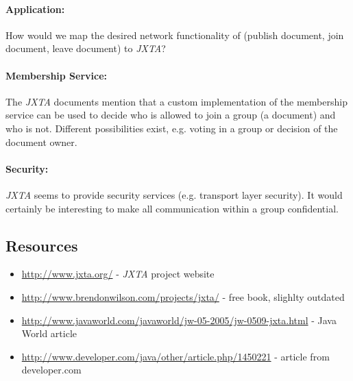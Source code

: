 \paragraph{Application:} How would we map the desired network functionality of \ace (publish document, join document, leave document) to \emph{JXTA}?

\paragraph{Membership Service:} The \emph{JXTA} documents mention that a custom implementation of the membership service can be used to decide who is allowed to join a group (a document) and who is not. Different possibilities exist, e.g. voting in a group or decision of the document owner.

\paragraph{Security:} \emph{JXTA} seems to provide security services (e.g. transport layer security). It would certainly be interesting to make all communication within a group confidential.



\subsection{Resources}
\begin{itemize}
 \item \url{http://www.jxta.org/} - \emph{JXTA} project website
 \item \url{http://www.brendonwilson.com/projects/jxta/} - free book, slighlty outdated
 \item \url{http://www.javaworld.com/javaworld/jw-05-2005/jw-0509-jxta.html} - Java World article
 \item \url{http://www.developer.com/java/other/article.php/1450221} - article from developer.com
\end{itemize}

